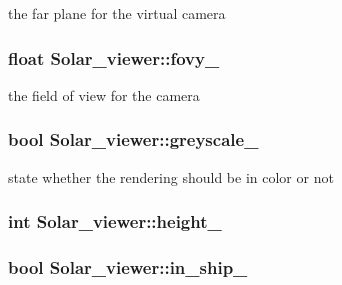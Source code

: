the far plane for the virtual camera 

\subsubsection[{\texorpdfstring{fovy\+\_\+}{fovy_}}]{\setlength{\rightskip}{0pt plus 5cm}float Solar\+\_\+viewer\+::fovy\+\_\+\hspace{0.3cm}{\ttfamily [private]}}\hypertarget{classSolar__viewer_a0ee3e25d0a16f5f8f2be784b42a3b576}{}\label{classSolar__viewer_a0ee3e25d0a16f5f8f2be784b42a3b576}


the field of view for the camera 

\subsubsection[{\texorpdfstring{greyscale\+\_\+}{greyscale_}}]{\setlength{\rightskip}{0pt plus 5cm}bool Solar\+\_\+viewer\+::greyscale\+\_\+\hspace{0.3cm}{\ttfamily [private]}}\hypertarget{classSolar__viewer_ad0da37e7839ea05cd500c59eacfc04cb}{}\label{classSolar__viewer_ad0da37e7839ea05cd500c59eacfc04cb}


state whether the rendering should be in color or not 

\subsubsection[{\texorpdfstring{height\+\_\+}{height_}}]{\setlength{\rightskip}{0pt plus 5cm}int Solar\+\_\+viewer\+::height\+\_\+\hspace{0.3cm}{\ttfamily [private]}}\hypertarget{classSolar__viewer_ae13eeec65d2a4ea4fda382687a4379cd}{}\label{classSolar__viewer_ae13eeec65d2a4ea4fda382687a4379cd}
\subsubsection[{\texorpdfstring{in\+\_\+ship\+\_\+}{in_ship_}}]{\setlength{\rightskip}{0pt plus 5cm}bool Solar\+\_\+viewer\+::in\+\_\+ship\+\_\+\hspace{0.3cm}{\ttfamily [private]}}\hypertarget{classSolar__viewer_a6bed73dabfc1ef5dbf51b1bf6b854a55}{}\label{classSolar__viewer_a6bed73dabfc1ef5dbf51b1bf6b854a55}


